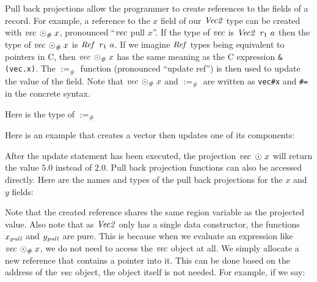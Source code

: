 Pull back projections allow the programmer to create references to the fields of a record. For example, a reference to the $x$ field of our $\operatorname{\mathit{Vec2}}$ type can be created with $\operatorname{\mathit{vec}} \: \odot_{\#} \: x$, pronounced ``$\operatorname{\mathit{vec}}$ pull $x$''. If the type of $\operatorname{\mathit{vec}}$ is $\operatorname{\mathit{Vec2}} \ r_1 \ a$ then the type of $\operatorname{\mathit{vec}} \: \odot_{\#} \: x$ is $\operatorname{\mathit{Ref}} \ r_1 \ a$. If we imagine $\operatorname{\mathit{Ref}}$ types being equivalent to pointers in C, then $\operatorname{\mathit{vec}} \: \odot_{\#} \: x$ has the same meaning as the C expression \texttt{\&(vec.x)}. The $:=_{\#}$ function (pronounced ``update ref'') is then used to update the value of the field. Note that $\operatorname{\mathit{vec}} \: \odot_{\#} \: x$ and $:=_{\#}$ are written as \texttt{vec\#x} and \texttt{\#=} in the concrete syntax.

Here is the type of $:=_{\#}$


Here is an example that creates a vector then updates one of its components:


After the update statement has been executed, the projection $\operatorname{\mathit{vec}} \ \odot \ x$ will return the value $5.0$ instead of $2.0$. Pull back projection functions can also be accessed directly. Here are the names and types of the pull back projections for the $x$ and $y$ fields:


Note that the created reference shares the same region variable as the projected value. Also note that as $\operatorname{\mathit{Vec2}}$ only has a single data constructor, the functions $x_{\operatorname{\mathit{pull}}}$ and $y_{\operatorname{\mathit{pull}}}$ are pure. This is because when we evaluate an expression like $\operatorname{\mathit{vec}} \: \odot_{\#} \: x$, we do not need to access the $\operatorname{\mathit{vec}}$ object at all. We simply allocate a new reference that contains a pointer into it. This can be done based on the address of the $\operatorname{\mathit{vec}}$ object, the object itself is not needed. For example, if we say:

